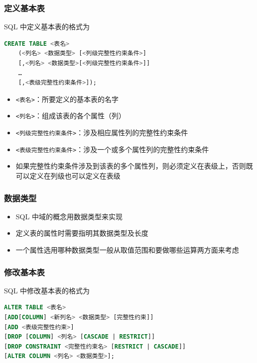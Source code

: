 \subsubsection{定义基本表}
SQL 中定义基本表的格式为
\begin{lstlisting}[language=sql]
CREATE TABLE <表名>
    (<列名> <数据类型> [<列级完整性约束条件>]
    [,<列名> <数据类型>[<列级完整性约束条件>]] 
   	…
    [,<表级完整性约束条件>]);
\end{lstlisting}

\begin{itemize}
    \item \verb|<表名>|：所要定义的基本表的名字
    \item \verb|<列名>|：组成该表的各个属性（列）
    \item \verb|<列级完整性约束条件>|：涉及相应属性列的完整性约束条件
    \item \verb|<表级完整性约束条件>|：涉及一个或多个属性列的完整性约束条件 
    \item 如果完整性约束条件涉及到该表的多个属性列，则必须定义在表级上，否则既可以定义在列级也可以定义在表级
\end{itemize}

\subsubsection{数据类型}
\begin{itemize}
    \item SQL 中域的概念用数据类型来实现
    \item 定义表的属性时需要指明其数据类型及长度 
    \item 一个属性选用哪种数据类型一般从取值范围和要做哪些运算两方面来考虑
\end{itemize}

\subsubsection{修改基本表}
SQL 中修改基本表的格式为
\begin{lstlisting}[language=sql]
ALTER TABLE <表名>
[ADD[COLUMN] <新列名> <数据类型> [完整性约束]]
[ADD <表级完整性约束>]
[DROP [COLUMN] <列名> [CASCADE | RESTRICT]]
[DROP CONSTRAINT <完整性约束名> [RESTRICT | CASCADE]]
[ALTER COLUMN <列名> <数据类型>];
\end{lstlisting}

